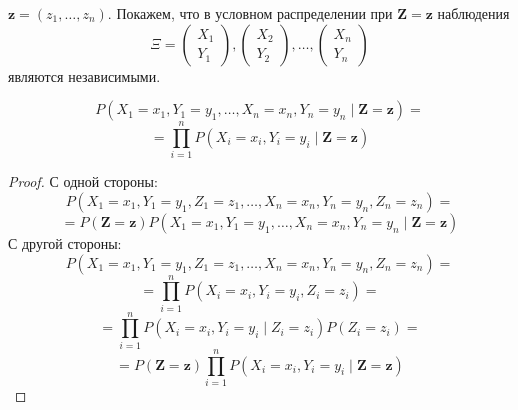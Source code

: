 $\mathbf{z}=(z_1,\ldots,z_n)$.
Покажем, что в условном распределении при $\mathbf{Z}=\mathbf{z}$ наблюдения
$$
\Xi = 
\begin{pmatrix}
        X_1 \\
        Y_1
    \end{pmatrix},
    \begin{pmatrix}
        X_2 \\
        Y_2
    \end{pmatrix}, \ldots,
    \begin{pmatrix}
        X_n \\
        Y_n
    \end{pmatrix}
$$
являются независимыми. 

\begin{lemma}\label{ci_for_samples}
    $$
    P(X_1=x_1,Y_1=y_1,\ldots,X_n=x_n,Y_n=y_n \mid \mathbf{Z}=\mathbf{z})=
    $$
    $$
    =\prod_{i=1}^n P(X_i=x_i, Y_i=y_i \mid \mathbf{Z}=\mathbf{z})
    $$
\end{lemma}
\begin{proof}
    С одной стороны:
    $$
    P(X_1=x_1,Y_1=y_1,Z_1=z_1,\ldots,X_n=x_n,Y_n=y_n,Z_n=z_n)=
    $$
    $$
    =P(\mathbf{Z}=\mathbf{z}) P(X_1=x_1,Y_1=y_1,\ldots,X_n=x_n,Y_n=y_n \mid \mathbf{Z}=\mathbf{z}) 
    $$
    С другой стороны:
    $$
    P(X_1=x_1,Y_1=y_1,Z_1=z_1,\ldots,X_n=x_n,Y_n=y_n,Z_n=z_n)=
    $$
    $$
    =\prod_{i=1}^n P(X_i=x_i, Y_i=y_i, Z_i=z_i)=
    $$
    $$
    =\prod_{i=1}^n P(X_i=x_i, Y_i=y_i \mid Z_i=z_i)P(Z_i=z_i)=
    $$
    $$
    =P(\mathbf{Z}=\mathbf{z})\prod_{i=1}^n P(X_i=x_i, Y_i=y_i \mid \mathbf{Z}=\mathbf{z})
    $$
\end{proof}


